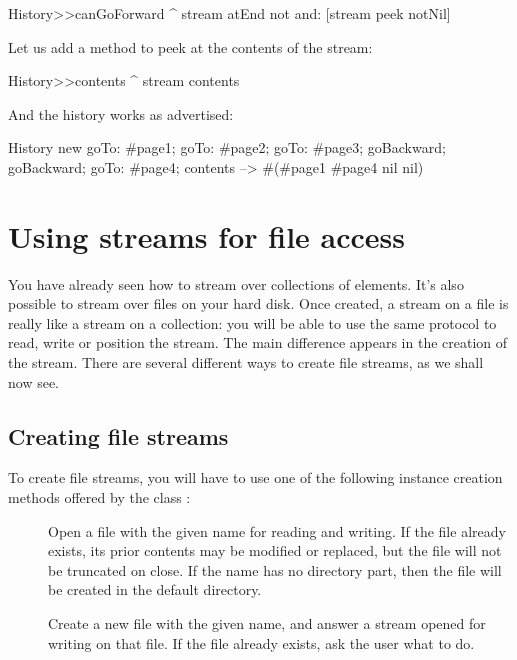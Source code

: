 \documentclass[a4paper,10pt,twoside]{book}
\begin{document}
{\begin{code}{}
History>>canGoForward
  ^ stream atEnd not and: [stream peek notNil]
\end{code}

Let us add a method to peek at the contents of the stream:
\begin{code}{}
History>>contents
  ^ stream contents
\end{code}

And the history works as advertised:
\begin{code}{}
History new
	goTo: #page1;
	goTo: #page2;
	goTo: #page3;
	goBackward;
	goBackward;
	goTo: #page4;
	contents --> #(#page1 #page4 nil nil)
\end{code}

\section{Using streams for file access}

You have already seen how to stream over collections of elements. It's
also possible to stream over files on your hard disk.
Once created, a stream on a file is really like a stream on a
collection: you will be able to use the same protocol to read, write
or position the stream.
The main difference appears in the creation of the stream.
There are several different ways to create file streams, as we shall now see.

\subsection{Creating file streams}

To create file streams, you will have to use one of the following
instance creation methods offered by the class :

\begin{description}

\item[] Open a file with the given name for reading and
  writing. If the file already exists, its prior contents may be
  modified or replaced, but the file will not be truncated on
  close. If the name has no directory part, then the file will be
  created in the default directory.
  
\item[] Create a new file with the given name,
  and answer a stream opened for writing on that file. If the file
  already exists, ask the user what to do.
  

\end{description}}
\end{document}
